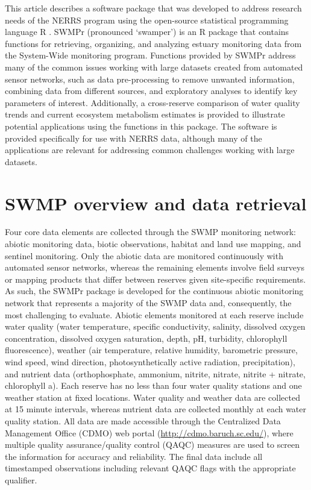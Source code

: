 This article describes a software package that was developed to address research needs of the NERRS program using the open-source statistical programming language R \cite{RDCT14}.  SWMPr (pronounced `swamper') is an R package that contains functions for retrieving, organizing, and analyzing estuary monitoring data from the System-Wide monitoring program.  Functions provided by SWMPr address many of the common issues working with large datasets created from automated sensor networks, such as data pre-processing to remove unwanted information, combining data from different sources, and exploratory analyses to identify key parameters of interest.  Additionally, a cross-reserve comparison of water quality trends and current ecosystem metabolism estimates is provided to illustrate potential applications using the functions in this package.  The software is provided specifically for use with NERRS data, although many of the applications are relevant for addressing common challenges working with large datasets.

\section{SWMP overview and data retrieval}

Four core data elements are collected through the SWMP monitoring network: abiotic monitoring data, biotic observations, habitat and land use mapping, and sentinel monitoring.  Only the abiotic data are monitored continuously with automated sensor networks, whereas the remaining elements involve field surveys or mapping products that differ between reserves given site-specific requirements.  As such, the SWMPr package is developed for the continuous abiotic monitoring network that represents a majority of the SWMP data and, consequently, the most challenging to evaluate.  Abiotic elements monitored at each reserve include water quality (water temperature, specific conductivity, salinity, dissolved oxygen concentration, dissolved oxygen saturation, depth, pH, turbidity, chlorophyll fluorescence), weather (air temperature, relative humidity, barometric pressure, wind speed, wind direction, photosynthetically active radiation, precipitation), and nutrient data (orthophosphate, ammonium, nitrite, nitrate, nitrite + nitrate, chlorophyll a).  Each reserve has no less than four water quality stations and one weather station at fixed locations.  Water quality and weather data are collected at 15 minute intervals, whereas nutrient data are collected monthly at each water quality station.  All data are made accessible through the Centralized Data Management Office (CDMO) web portal (\url{http://cdmo.baruch.sc.edu/}), where multiple quality assurance/quality control (QAQC) measures are used to screen the information for accuracy and reliability.  The final data include all timestamped observations including relevant QAQC flags with the appropriate qualifier.

